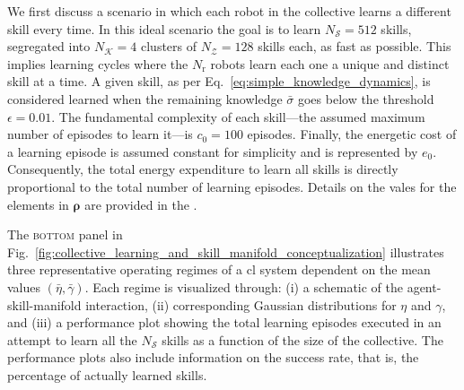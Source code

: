 \documentclass[12pt]{article}
\begin{document}
%

We first discuss a scenario in which each robot in the collective learns a different skill every time. In this ideal scenario the goal is to learn $N_\mathcal{S}=512$ skills, segregated into $N_\mathcal{K}=4$ clusters of $N_\mathcal{Z} = 128$ skills each, as fast as possible. This implies learning cycles where the $N_\mathrm{r}$ robots learn each one a unique and distinct skill at a time. A given skill, as per Eq.~\eqref{eq:simple_knowledge_dynamics}, is considered learned when the remaining knowledge $\bar{\sigma}$ goes below the threshold $\epsilon = 0.01$. The fundamental complexity of each skill---the assumed maximum number of episodes to learn it---is $c_0 = 100$ episodes. Finally, the energetic cost of a learning episode is assumed constant for simplicity and is represented by $ e_0 $. Consequently, the total energy expenditure to learn all skills is directly proportional to the total number of learning episodes. Details on the vales for the elements in $\bm{\rho}$ are provided in the .

The \textsc{bottom} panel in Fig.~\ref{fig:collective_learning_and_skill_manifold_conceptualization}  illustrates three representative operating regimes of a \ac{cl} system dependent on the mean values $(\bar{\eta}, \bar{\gamma})$. Each regime is visualized through: (i) a schematic of the agent-skill-manifold interaction, (ii) corresponding Gaussian distributions for $\eta$ and $\gamma$, and (iii) a performance plot showing the total learning episodes executed in an attempt to learn all the $ N_\mathcal{S} $ skills as a function of the size of the collective. The performance plots also include information on the success rate, that is, the percentage of actually learned skills.
\end{document}
